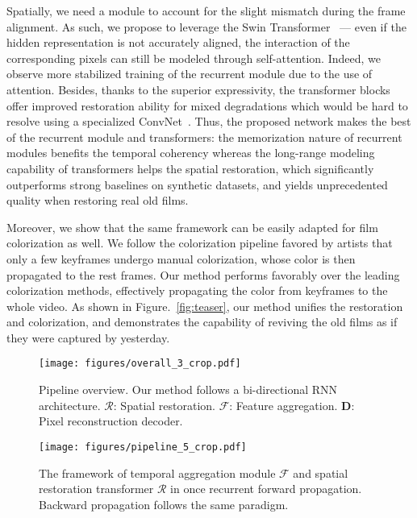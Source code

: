 \documentclass[10pt,twocolumn,letterpaper]{article}
\begin{document}
	Spatially, we need a module to account for the slight mismatch during the frame alignment. As such, we propose to leverage the Swin Transformer~\cite{Liu_2021_ICCV} --- even if the hidden representation is not accurately aligned, the interaction of the corresponding pixels can still be modeled through self-attention. Indeed, we observe more stabilized training of the recurrent module due to the use of attention. Besides, thanks to the superior expressivity, the transformer blocks offer improved restoration ability for mixed degradations which would be hard to resolve using a specialized ConvNet~\cite{yu2018crafting,suganuma2019attention}. Thus, the proposed network makes the best of the recurrent module and transformers: the memorization nature of recurrent modules benefits the temporal coherency whereas the long-range modeling capability of transformers helps the spatial restoration, which significantly outperforms strong baselines on synthetic datasets, and yields unprecedented quality when restoring real old films.
	
	
	Moreover, we show that the same framework can be easily adapted for film colorization as well. We follow the colorization pipeline favored by artists that only a few keyframes undergo manual colorization, whose color is then propagated to the rest frames. Our method performs favorably over the leading colorization methods, effectively propagating the color from keyframes to the whole video. As shown in Figure.~\ref{fig:teaser}, our method unifies the restoration and colorization, and demonstrates the capability of reviving the old films as if they were captured by yesterday.
	
	
	\begin{figure}[!t]
		\begin{center}
			\texttt{[image: figures/overall\_3\_crop.pdf]}
			\vspace{-1.4em}
			\caption{{Pipeline overview.} Our method follows a bi-directional RNN architecture. $\mathcal{R}$: Spatial restoration. $\mathcal{F}$: Feature aggregation. $\mathbf{D}$: Pixel reconstruction decoder.}
			\label{fig:overall_pipeline}
		\end{center}
		\vspace{-2.5em}
	\end{figure}
	
	
	\begin{figure*}[!t]
		\begin{center}
			\texttt{[image: figures/pipeline\_5\_crop.pdf]}
			\vspace{-1.4em}
			\caption{{The framework of temporal aggregation module $\mathcal{F}$ and spatial restoration transformer $\mathcal{R}$ in once recurrent forward propagation.} Backward propagation follows the same paradigm.}
			\label{fig:recurrent_pipeline}
		\end{center}
		\vspace{-2.0em}
	\end{figure*}
	
\end{document}
